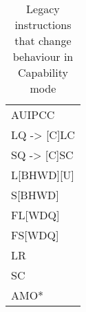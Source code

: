 \begin{table}[]
    \centering
    \begin{tabular}{l}
        AUIPCC \\
        LQ -> [C]LC \\
        SQ -> [C]SC \\
        L[BHWD][U] \\
        S[BHWD] \\
        FL[WDQ] \\
        FS[WDQ] \\
        LR \\
        SC \\
        AMO* \\
    \end{tabular}
    \caption{Legacy instructions that change behaviour in Capability mode}
    \label{tab:my_label}
\end{table}